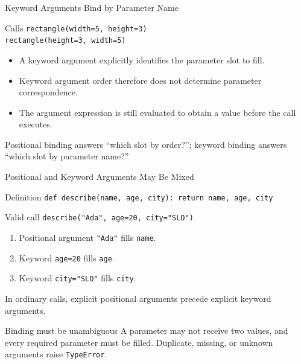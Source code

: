 \documentclass[aspectratio=169,10pt]{beamer}
\begin{document}
\begin{frame}{Keyword Arguments Bind by Parameter Name}
  \begin{block}{Calls}
    \texttt{rectangle(width=5, height=3)}\\
    \texttt{rectangle(height=3, width=5)}
  \end{block}

  \begin{itemize}
    \item A keyword argument explicitly identifies the parameter slot to fill.
    \item Keyword argument order therefore does not determine parameter correspondence.
    \item The argument expression is still evaluated to obtain a value before the call executes.
  \end{itemize}

  \begin{keyidea}
    Positional binding answers ``which slot by order?''; keyword binding answers ``which slot by parameter name?''
  \end{keyidea}
\end{frame}

\begin{frame}{Positional and Keyword Arguments May Be Mixed}
  \begin{block}{Definition}
    \texttt{def describe(name, age, city):}\
    \hspace*{0.20in}\texttt{return name, age, city}
  \end{block}

  \begin{block}{Valid call}
    \texttt{describe("Ada", age=20, city="SLO")}
  \end{block}

  \begin{enumerate}
    \item Positional argument \texttt{"Ada"} fills \texttt{name}.
    \item Keyword \texttt{age=20} fills \texttt{age}.
    \item Keyword \texttt{city="SLO"} fills \texttt{city}.
  \end{enumerate}

  In ordinary calls, explicit positional arguments precede explicit keyword arguments.

  \begin{alertblock}{Binding must be unambiguous}
    A parameter may not receive two values, and every required parameter must be filled. Duplicate, missing, or unknown arguments raise \texttt{TypeError}.
  \end{alertblock}
\end{frame}
\end{document}
